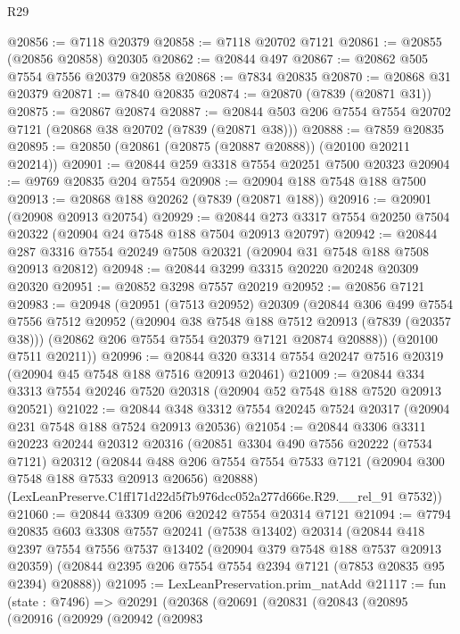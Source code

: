 \begin{lexlean}{R29}
\begin{coremodule}
@20856 := @7118 @20379
@20858 := @7118 @20702 @7121
@20861 := @20855 (@20856 @20858) @20305
@20862 := @20844 @497
@20867 := @20862 @505 @7554 @7556 @20379 @20858
@20868 := @7834 @20835
@20870 := @20868 @31 @20379
@20871 := @7840 @20835
@20874 := @20870 (@7839 (@20871 @31))
@20875 := @20867 @20874
@20887 := @20844 @503 @206 @7554 @7554 @20702 @7121 (@20868 @38 @20702 (@7839 (@20871 @38)))
@20888 := @7859 @20835
@20895 := @20850 (@20861 (@20875 (@20887 @20888)) (@20100 @20211 @20214))
@20901 := @20844 @259 @3318 @7554 @20251 @7500 @20323
@20904 := @9769 @20835 @204 @7554
@20908 := @20904 @188 @7548 @188 @7500
@20913 := @20868 @188 @20262 (@7839 (@20871 @188))
@20916 := @20901 (@20908 @20913 @20754)
@20929 := @20844 @273 @3317 @7554 @20250 @7504 @20322 (@20904 @24 @7548 @188 @7504 @20913 @20797)
@20942 := @20844 @287 @3316 @7554 @20249 @7508 @20321 (@20904 @31 @7548 @188 @7508 @20913 @20812)
@20948 := @20844 @3299 @3315 @20220 @20248 @20309 @20320
@20951 := @20852 @3298 @7557 @20219
@20952 := @20856 @7121
@20983 := @20948
    (@20951
      (@7513 @20952)
      @20309
      (@20844
        @306
        @499
        @7554
        @7556
        @7512
        @20952
        (@20904 @38 @7548 @188 @7512 @20913 (@7839 (@20357 @38)))
        (@20862 @206 @7554 @7554 @20379 @7121 @20874 @20888))
      (@20100 @7511 @20211))
@20996 := @20844 @320 @3314 @7554 @20247 @7516 @20319 (@20904 @45 @7548 @188 @7516 @20913 @20461)
@21009 := @20844 @334 @3313 @7554 @20246 @7520 @20318 (@20904 @52 @7548 @188 @7520 @20913 @20521)
@21022 := @20844 @348 @3312 @7554 @20245 @7524 @20317 (@20904 @231 @7548 @188 @7524 @20913 @20536)
@21054 := @20844
    @3306
    @3311
    @20223
    @20244
    @20312
    @20316
    (@20851
      @3304
      @490
      @7556
      @20222
      (@7534 @7121)
      @20312
      (@20844 @488 @206 @7554 @7554 @7533 @7121 (@20904 @300 @7548 @188 @7533 @20913 @20656) @20888)
      (LexLeanPreserve.C1ff171d22d5f7b976dcc052a277d666e.R29.__rel_91 @7532))
@21060 := @20844 @3309 @206 @20242 @7554 @20314 @7121
@21094 := @7794
    @20835
    @603
    @3308
    @7557
    @20241
    (@7538 @13402)
    @20314
    (@20844
      @418
      @2397
      @7554
      @7556
      @7537
      @13402
      (@20904 @379 @7548 @188 @7537 @20913 @20359)
      (@20844 @2395 @206 @7554 @7554 @2394 @7121 (@7853 @20835 @95 @2394) @20888))
@21095 := LexLeanPreservation.prim_natAdd
@21117 := fun (state : @7496) =>
  @20291
    (@20368
      (@20691
        (@20831
          (@20843
            (@20895
              (@20916
                (@20929
                  (@20942
                    (@20983

\end{coremodule}
\end{lexlean}
